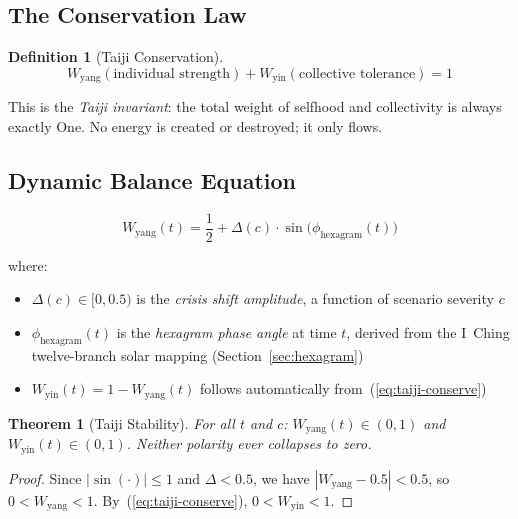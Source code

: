 \documentclass[conference]{IEEEtran}
\newtheorem{theorem}{Theorem}
\newtheorem{definition}{Definition}
\begin{document}
\subsection{The Conservation Law}

\begin{definition}[Taiji Conservation]
\begin{equation}
  W_{\text{yang}}(\text{individual strength})
  + W_{\text{yin}}(\text{collective tolerance}) = 1
  \label{eq:taiji-conserve}
\end{equation}
\end{definition}

This is the \emph{Taiji invariant}: the total weight
of selfhood and collectivity is always exactly One.
No energy is created or destroyed; it only flows.

\subsection{Dynamic Balance Equation}

\begin{equation}
  W_{\text{yang}}(t)
  = \frac{1}{2}
    + \Delta(c)\cdot\sin\!\bigl(\phi_{\text{hexagram}}(t)\bigr)
  \label{eq:yang-dynamic}
\end{equation}

where:
\begin{itemize}
  \item $\Delta(c) \in [0, 0.5)$ is the
    \emph{crisis shift amplitude}, a function of
    scenario severity $c$
  \item $\phi_{\text{hexagram}}(t)$ is the
    \emph{hexagram phase angle} at time $t$,
    derived from the I~Ching twelve-branch
    solar mapping (Section~\ref{sec:hexagram})
  \item $W_{\text{yin}}(t) = 1 - W_{\text{yang}}(t)$
    follows automatically from~(\ref{eq:taiji-conserve})
\end{itemize}

\begin{theorem}[Taiji Stability]
For all $t$ and $c$:
$W_{\text{yang}}(t) \in (0, 1)$
and $W_{\text{yin}}(t) \in (0, 1)$.
Neither polarity ever collapses to zero.
\end{theorem}

\begin{proof}
Since $|\sin(\cdot)| \leq 1$ and $\Delta < 0.5$,
we have $|W_{\text{yang}} - 0.5| < 0.5$,
so $0 < W_{\text{yang}} < 1$.
By~(\ref{eq:taiji-conserve}), $0 < W_{\text{yin}} < 1$.
\end{proof}
\end{document}
